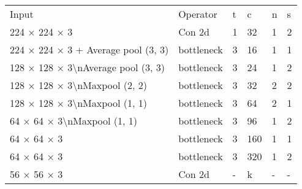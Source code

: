 \begin{tabular}{llllll}

Input &   Operator & t &   c & n & s \\

224 × 224 × 3 &     Con 2d & 1 &  32 & 1 & 2 \\

224 × 224 × 3  +  Average pool (3, 3) & bottleneck & 3 &  16 & 1 & 1 \\

128 × 128 × 3\textbackslash nAverage pool (3, 3) & bottleneck & 3 &  24 & 1 & 2 \\

128 × 128 × 3\textbackslash nMaxpool (2, 2) & bottleneck & 3 &  32 & 2 & 2 \\

128 × 128 × 3\textbackslash nMaxpool (1, 1) & bottleneck & 3 &  64 & 2 & 1 \\

64 × 64 × 3\textbackslash nMaxpool (1, 1) & bottleneck & 3 &  96 & 1 & 2 \\

64 × 64 × 3 & bottleneck & 3 & 160 & 1 & 1 \\

64 × 64 × 3 & bottleneck & 3 & 320 & 1 & 2 \\

56 × 56 × 3 &     Con 2d & - &   k & - & - \\

\end{tabular}
